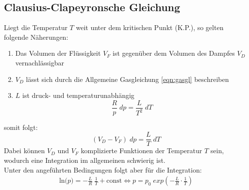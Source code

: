 \subsection{Clausius-Clapeyronsche Gleichung}
Liegt die Temperatur $T$ weit unter dem kritischen Punkt (K.P.), so gelten folgende Näherungen:
\begin{enumerate}
    \item Das Volumen der Flüssigkeit $V_F$ ist gegenüber dem Volumen des Dampfes $V_D$ vernachlässigbar
    \item $V_D$ lässt sich durch die Allgemeine Gasgleichung \ref{eqn:gasgl} beschreiben
    \item $L$ ist druck- und temperaturunabhängig
    \begin{equation}
        \frac{R}{p}\;dp=\frac{L}{T^2}\;dT
    \end{equation}
\end{enumerate}
somit folgt:
\begin{equation}
    (V_D-V_F)\;dp=\frac{L}{T}\;dT
    \label{eqn:L}
\end{equation}
Dabei können $V_D$ und $V_F$ komplizierte Funktionen der Temperatur $T$ sein, wodurch eine 
Integration im allgemeinen schwierig ist.\\
Unter den angeführten Bedingungen folgt aber für die Integration:
\begin{gather}
    \textrm{ln($p$)} = -\frac{L}{R}\;\frac{1}{T}+\textrm{const}
   \Longleftrightarrow p=p_0\;exp(-\frac{L}{R}\cdot \frac{1}{T})
   \label{eqn:logarithm_p}
\end{gather}